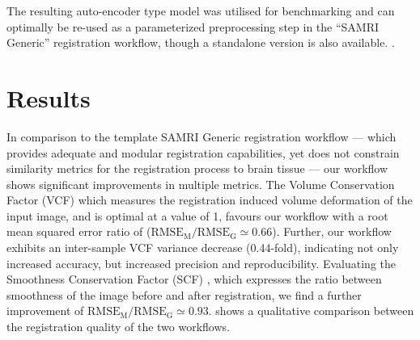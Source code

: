 \documentclass[11pt, english]{article}
\begin{document}
    The resulting auto-encoder type model was utilised for benchmarking and can optimally be re-used as a parameterized preprocessing step in the “SAMRI Generic” \citet{ioanas_optimized_2019} registration workflow, though a standalone version is also available.
    \citep{irsabi_bidsdata}.


    \section{Results}
    In comparison to the template SAMRI Generic registration workflow --- which provides adequate and modular registration capabilities, yet does not constrain similarity metrics for the registration process to brain tissue --- our workflow shows significant improvements in multiple metrics.
    The Volume Conservation Factor (VCF) \citep{ioanas_optimized_2019} which measures the registration induced volume deformation of the input image, and is optimal at a value of 1, favours our workflow with a root mean squared error ratio of ($\mathrm{RMSE_{M}/RMSE_{G}\simeq} 0.66$).
    Further, our workflow exhibits an inter-sample VCF variance decrease (0.44-fold), indicating not only increased accuracy, but increased precision and reproducibility.
    Evaluating the Smoothness Conservation Factor (SCF) \citep{ioanas_optimized_2019}, which expresses the ratio between smoothness of the image before and after registration, we find a further improvement of $\mathrm{RMSE_{M}/RMSE_{G}\simeq} 0.93$.
     shows a qualitative comparison between the registration quality of the two workflows.


    \begin{sansmath}
    \end{sansmath}
\end{document}
